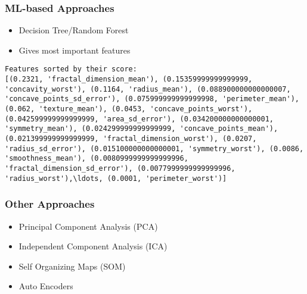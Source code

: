 %
\begin{frame}[fragile]\frametitle{ML-based Approaches}
	\begin{itemize}
	\item Decision Tree/Random Forest
	\item Gives most important features
	\end{itemize}
\begin{lstlisting}
Features sorted by their score:
[(0.2321, 'fractal_dimension_mean'), (0.15359999999999999, 'concavity_worst'), (0.1164, 'radius_mean'), (0.088900000000000007, 'concave_points_sd_error'), (0.075999999999999998, 'perimeter_mean'), (0.062, 'texture_mean'), (0.0453, 'concave_points_worst'), (0.042599999999999999, 'area_sd_error'), (0.034200000000000001, 'symmetry_mean'), (0.024299999999999999, 'concave_points_mean'), (0.021399999999999999, 'fractal_dimension_worst'), (0.0207, 'radius_sd_error'), (0.015100000000000001, 'symmetry_worst'), (0.0086, 'smoothness_mean'), (0.0080999999999999996, 'fractal_dimension_sd_error'), (0.0077999999999999996, 'radius_worst'),\ldots, (0.0001, 'perimeter_worst')]
\end{lstlisting}

\end{frame}

\begin{frame}[fragile]\frametitle{Other Approaches}
	\begin{itemize}
	\item Principal Component Analysis (PCA)
	\item Independent Component Analysis (ICA)
	\item Self Organizing Maps (SOM)
	\item Auto Encoders
	\end{itemize}
\end{frame}


